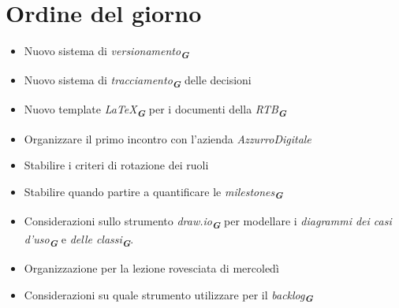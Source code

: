 

\section{Ordine del giorno}

\begin{itemize}
    \item Nuovo sistema di \emph{versionamento}\textsubscript{\textit{\textbf{G}}}
    \item Nuovo sistema di \emph{tracciamento}\textsubscript{\textit{\textbf{G}}} delle decisioni
    \item Nuovo template \emph{LaTeX}\textsubscript{\textit{\textbf{G}}} per i documenti della \emph{RTB}\textsubscript{\textit{\textbf{G}}}
    \item Organizzare il primo incontro con l'azienda \emph{AzzurroDigitale}
    \item Stabilire i criteri di rotazione dei ruoli
    \item Stabilire quando partire a quantificare le \emph{milestones}\textsubscript{\textit{\textbf{G}}}
    \item Considerazioni sullo strumento \emph{draw.io}\textsubscript{\textit{\textbf{G}}} per modellare i \emph{diagrammi dei casi d'uso}\textsubscript{\textit{\textbf{G}}}
    e \emph{delle classi}\textsubscript{\textit{\textbf{G}}}.
    \item Organizzazione per la lezione rovesciata di mercoledì 
    \item Considerazioni su quale strumento utilizzare per il \emph{backlog}\textsubscript{\textit{\textbf{G}}}
\end{itemize}
